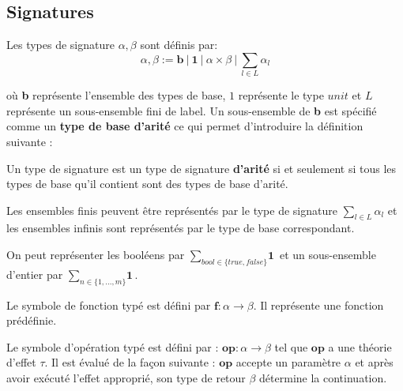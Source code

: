 \subsection{Signatures}

	Les types de signature $\alpha,\beta$ sont définis par:
	\[\alpha,\beta := \textbf{b}~|~\textbf{1}~|~\alpha \times \beta~|~\sum_{l \in L}\alpha_l\]
			
	où \textbf{b} représente l'ensemble des types de base, $1$ représente le type $unit$ et $L$ représente un sous-ensemble fini de label. 
	Un sous-ensemble de \textbf{b} est spécifié comme un \textbf{type de base d'arité} ce qui permet d'introduire la définition suivante : 
	
	\begin{definition}
		Un type de signature est un type de signature \textbf{d'arité} si et seulement si tous les types de base qu'il contient sont des types de base d'arité.
	\end{definition}
	
	Les ensembles finis peuvent être représentés par le type de signature $\sum_{l \in L}\alpha_l$ et les ensembles infinis sont représentés par le type de base correspondant.
	
	\begin{exemple}
		On peut représenter les booléens par  $\sum_{bool \in \{true,false\}} \textbf{1}$ et un sous-ensemble d'entier par $\sum_{n \in \{1,...,m\}}\textbf{1}$.
	\end{exemple}
	\bigbreak

	Le symbole de fonction typé est défini par $\textbf{f} : \alpha \rightarrow \beta$. Il représente une fonction prédéfinie.

	
	\medbreak
	
	Le symbole d'opération typé est défini par : $\textbf{op} : \alpha \rightarrow \beta$ tel que $\textbf{op}$ a une théorie d'effet $\tau$.
	Il est évalué de la façon suivante :
	$\textbf{op}$ accepte un paramètre $\alpha$ et après avoir exécuté l'effet approprié, son type de retour $\beta$ détermine la continuation.

